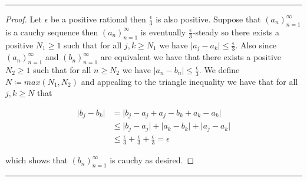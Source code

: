 \documentclass{article}
\newcommand{\lined}{\noindent\rule{\textwidth}{1pt}}
\begin{document}
	\lined
		\begin{proof}
			Let $\epsilon$ be a positive rational then $\frac{\epsilon}{3}$ is also positive. Suppose that $(a_n)_{n = 1}^{\infty}$ is a cauchy sequence then $(a_n)_{n = 1}^{\infty}$ is eventually $\frac{\epsilon}{3}$-steady so there exists a positive $N_1 \geq 1$ such that for all $j,k \geq N_1$ we have $\lvert a_j - a_k \rvert \leq \frac{\epsilon}{3}$. Also since $(a_n)_{n = 1}^{\infty}$ and  $(b_n)_{n = 1}^{\infty}$ are equivalent we have that there exists a positive $N_2 \geq 1$ such that for all $n \geq N_2$ we have $\lvert a_n - b_n \rvert \leq \frac{\epsilon}{3}$. 
We define $N \coloneqq max(N_1, N_2)$ and appealing to the triangle inequality we have that for all $j,k \geq N$ that 

	\begin{align*}
		\lvert b_j - b_k \rvert  & = \lvert b_j - a_j + a_j  - b_k + a_k - a_k \rvert \\ & \leq \lvert b_j - a_j \rvert  + \lvert a_k - b_k \rvert + \lvert a_j - a_k \rvert 
		 \\ & \leq \frac{\epsilon}{3} + \frac{\epsilon}{3} + \frac{\epsilon}{3} = \epsilon
	\end{align*}
	
	\noindent which shows that $(b_n)_{n = 1}^{\infty}$ is cauchy as desired.
		\end{proof}
	\lined

	
\end{document}
